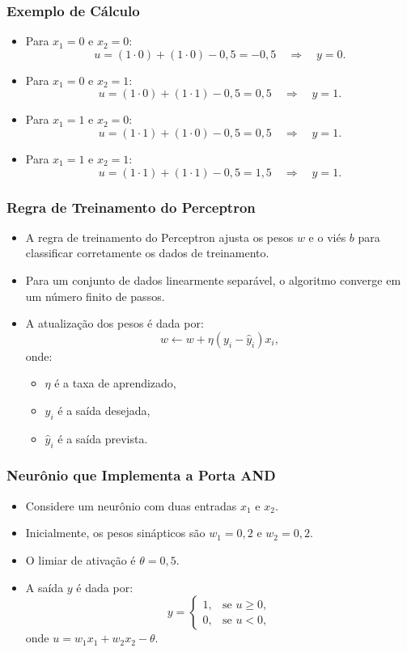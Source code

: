 \documentclass[aspectratio=169]{beamer}
\begin{document}
\begin{frame}
\frametitle{Exemplo de Cálculo}
\begin{itemize}
    \item Para \( x_1 = 0 \) e \( x_2 = 0 \):
    \[
    u = (1 \cdot 0) + (1 \cdot 0) - 0,5 = -0,5 \quad \Rightarrow \quad y = 0.
    \]
    \item Para \( x_1 = 0 \) e \( x_2 = 1 \):
    \[
    u = (1 \cdot 0) + (1 \cdot 1) - 0,5 = 0,5 \quad \Rightarrow \quad y = 1.
    \]
    \item Para \( x_1 = 1 \) e \( x_2 = 0 \):
    \[
    u = (1 \cdot 1) + (1 \cdot 0) - 0,5 = 0,5 \quad \Rightarrow \quad y = 1.
    \]
    \item Para \( x_1 = 1 \) e \( x_2 = 1 \):
    \[
    u = (1 \cdot 1) + (1 \cdot 1) - 0,5 = 1,5 \quad \Rightarrow \quad y = 1.
    \]
\end{itemize}
\end{frame}


\begin{frame}
\frametitle{Regra de Treinamento do Perceptron}
\begin{itemize}
    \item A regra de treinamento do Perceptron ajusta os pesos \( w \) e o viés \( b \) para classificar corretamente os dados de treinamento.
    \item Para um conjunto de dados linearmente separável, o algoritmo converge em um número finito de passos.
    \item A atualização dos pesos é dada por:
    \[
    w \leftarrow w + \eta (y_i - \hat{y}_i) x_i,
    \]
    onde:
    \begin{itemize}
        \item \( \eta \) é a taxa de aprendizado,
        \item \( y_i \) é a saída desejada,
        \item \( \hat{y}_i \) é a saída prevista.
    \end{itemize}
\end{itemize}
\end{frame}


\begin{frame}
\frametitle{Neurônio que Implementa a Porta AND}
\begin{itemize}
    \item Considere um neurônio com duas entradas \( x_1 \) e \( x_2 \).
    \item Inicialmente, os pesos sinápticos são \( w_1 = 0,2 \) e \( w_2 = 0,2 \).
    \item O limiar de ativação é \( \theta = 0,5 \).
    \item A saída \( y \) é dada por:
    \[
    y = \begin{cases}
    1, & \text{se } u \geq 0, \\
    0, & \text{se } u < 0,
    \end{cases}
    \]
    onde \( u = w_1 x_1 + w_2 x_2 - \theta \).
\end{itemize}
\end{frame}
\end{document}
